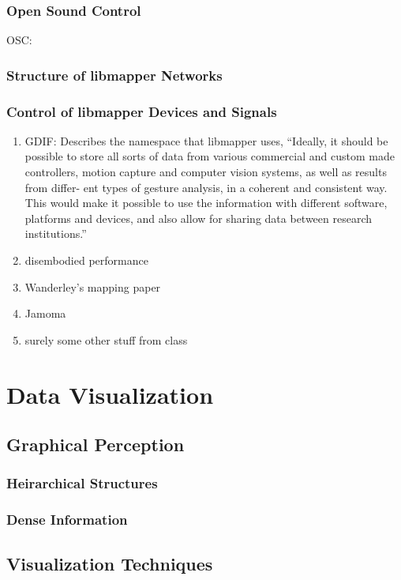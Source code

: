		\subsubsection{Open Sound Control}
		OSC: 
		\subsubsection{Structure of libmapper Networks}
		\subsubsection{Control of libmapper Devices and Signals}
	\begin{enumerate}
		\item GDIF:  Describes the namespace that libmapper uses, ``Ideally, it should be possible to store all sorts of data from various commercial and custom made controllers, motion capture and computer vision systems, as well as results from differ- ent types of gesture analysis, in a coherent and consistent way. This would make it possible to use the information with different software, platforms and devices, and also allow for sharing data between research institutions.'' 
		\item disembodied performance
		\item Wanderley's mapping paper  
		\item Jamoma 
		\item surely some other stuff from class
	\end{enumerate}

\section{Data Visualization}
	\subsection{Graphical Perception}
		\subsubsection{Heirarchical Structures}
		\subsubsection{Dense Information}
	\subsection{Visualization Techniques}
